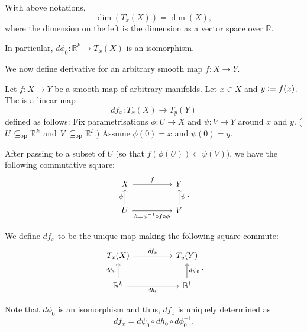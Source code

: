 \begin{thm}
	With above notations,
	\begin{equation*} 
		\boxed{\dim(T_{x}(X)) = \dim(X),}
	\end{equation*}
	where the dimension on the left is the dimension as a vector space over $\mathbb{R}$.

	In particular, $d\phi_{0} : \mathbb{R}^{k} \to T_{x}(X)$ is an isomorphism.
\end{thm}

We now define derivative for an arbitrary smooth map $f : X \to Y$.

\begin{defn}
	Let $f : X \to Y$ be a smooth map of arbitrary manifolds. Let $x \in X$ and $y \vcentcolon= f(x)$. The  is a linear map
	\begin{equation*} 
		df_{x} : T_{x}(X) \to T_{y}(Y)
	\end{equation*}
	defined as follows: Fix parametrisations $\phi : U \to X$ and $\psi : V \to Y$ around $x$ and $y$. ($U \subseteq_{\operatorname{op}} \mathbb{R}^{k}$ and $V \subseteq_{\operatorname{op}} \mathbb{R}^{l}$.) Assume $\phi(0) = x$ and $\psi(0) = y$.

	After passing to a subset of $U$ (so that $f(\phi(U)) \subset \psi(V)$), we have the following commutative square:
	\begin{equation*} 
		\begin{tikzcd}
			X \arrow[rr, "f"] & & Y \\
			U \arrow[u, "\phi"] \arrow[rr, "h = \psi^{-1} \circ f \circ \phi"'] & & V \arrow[u, "\psi"']
		\end{tikzcd}.
	\end{equation*}

	We define $df_{x}$ to be the unique map making the following square commute:
	\begin{equation*} 
		\begin{tikzcd}
			T_{x}(X) \arrow[rr, "df_{x}"] & & T_{y}(Y) \\
			\mathbb{R}^{k} \arrow[u, "d\phi_{0}"] \arrow[rr, "dh_{0}"'] & & \mathbb{R}^{l} \arrow[u, "d\psi_{0}"']
		\end{tikzcd}.
	\end{equation*}
\end{defn}
Note that $d\phi_{0}$ is an isomorphism and thus, $df_{x}$ is uniquely determined as
\begin{equation*} 
	df_{x} = d\psi_{0} \circ dh_{0} \circ d\phi_{0}^{-1}.
\end{equation*}


